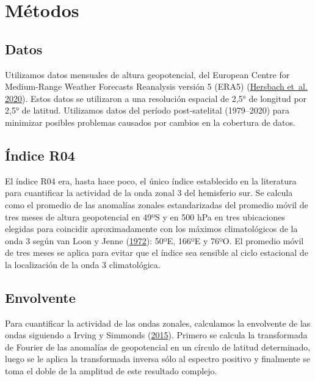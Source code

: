 \documentclass[12pt,oneside,a4paper]{reedthesis}
\begin{document}
\hypertarget{muxe9todos}{%
\section{Métodos}\label{muxe9todos}}

\hypertarget{datos}{%
\subsection{Datos}\label{datos}}

Utilizamos datos mensuales de altura geopotencial, del European Centre for Medium-Range Weather Forecasts Reanalysis versión 5 (ERA5) (\protect\hyperlink{ref-hersbach2020}{Hersbach et~al. 2020}). Estos datos se utilizaron a una resolución espacial de 2,5° de longitud por 2,5° de latitud.
Utilizamos datos del período post-satelital (1979--2020) para minimizar posibles problemas causados por cambios en la cobertura de datos.

\hypertarget{uxedndice-r04}{%
\subsection{Índice R04}\label{uxedndice-r04}}

El índice R04 era, hasta hace poco, el único índice establecido en la literatura para cuantificar la actividad de la onda zonal 3 del hemisferio sur.
Se calcula como el promedio de las anomalías zonales estandarizadas del promedio móvil de tres meses de altura geopotencial en 49ºS y en 500 hPa en tres ubicaciones elegidas para coincidir aproximadamente con los máximos climatológicos de la onda 3 según van Loon y Jenne (\protect\hyperlink{ref-vanloon1972}{1972}): 50ºE, 166ºE y 76ºO.
El promedio móvil de tres meses se aplica para evitar que el índice sea sensible al ciclo estacional de la localización de la onda 3 climatológica.

\hypertarget{envolvente}{%
\subsection{Envolvente}\label{envolvente}}

Para cuantificar la actividad de las ondas zonales, calculamos la envolvente de las ondas siguiendo a Irving y Simmonds (\protect\hyperlink{ref-irving2015}{2015}).
Primero se calcula la transformada de Fourier de las anomalías de geopotencial en un círculo de latitud determinado, luego se le aplica la transformada inversa sólo al espectro positivo y finalmente se toma el doble de la amplitud de este resultado complejo.
\end{document}
